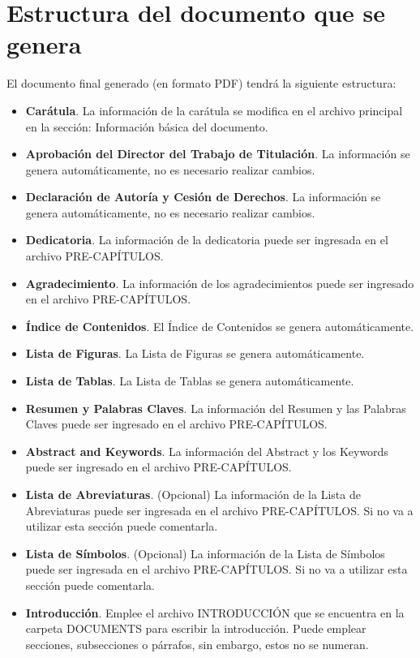 \section{Estructura del documento que se genera}
El documento final generado (en formato PDF) tendrá la siguiente estructura:

\begin{itemize}
	\item \textbf{Carátula}. La información de la carátula se modifica en el archivo principal en la sección: Información básica del documento.  
	\item \textbf{Aprobación del Director del Trabajo de Titulación}. La información se genera automáticamente, no es necesario realizar cambios. 
	\item \textbf{Declaración de Autoría y Cesión de Derechos}. La información se genera automáticamente, no es necesario realizar cambios. 
	\item \textbf{Dedicatoria}. La información de la dedicatoria puede ser ingresada en el archivo PRE-CAPÍTULOS. 
	\item \textbf{Agradecimiento}. La información de los agradecimientos puede ser ingresado en el archivo PRE-CAPÍTULOS. 
	\item \textbf{Índice de Contenidos}. El Índice de Contenidos se genera automáticamente. 
	\item \textbf{Lista de Figuras}. La Lista de Figuras se genera automáticamente. 
	\item \textbf{Lista de Tablas}. La Lista de Tablas se genera automáticamente. 
	\item \textbf{Resumen y Palabras Claves}. La información del Resumen y las Palabras Claves puede ser ingresado en el archivo PRE-CAPÍTULOS.
	\item \textbf{Abstract and Keywords}. La información del Abstract y los Keywords puede ser ingresado en el archivo PRE-CAPÍTULOS.
	\item \textbf{Lista de Abreviaturas}. (Opcional) La información de la Lista de Abreviaturas puede ser ingresada en el archivo PRE-CAPÍTULOS. Si no va a utilizar esta sección puede comentarla. 
	\item \textbf{Lista de Símbolos}. (Opcional) La información de la Lista de Símbolos puede ser ingresada en el archivo PRE-CAPÍTULOS. Si no va a utilizar esta sección puede comentarla. 
	\item \textbf{Introducción}. Emplee el archivo INTRODUCCIÓN que se encuentra en la carpeta DOCUMENTS para escribir la introducción. Puede emplear secciones, subsecciones o párrafos, sin embargo, estos no se numeran. 

\end{itemize}
